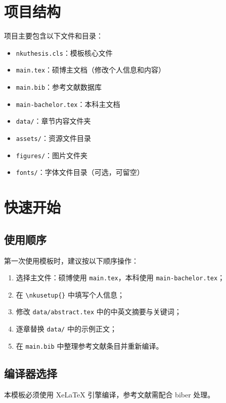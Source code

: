 \section{项目结构}

项目主要包含以下文件和目录：

\begin{itemize}
    \item \texttt{nkuthesis.cls}：模板核心文件
    \item \texttt{main.tex}：硕博主文档（修改个人信息和内容）
    \item \texttt{main.bib}：参考文献数据库
    \item \texttt{main-bachelor.tex}：本科主文档
    \item \texttt{data/}：章节内容文件夹
    \item \texttt{assets/}：资源文件目录
    \item \texttt{figures/}：图片文件夹
    \item \texttt{fonts/}：字体文件目录（可选，可留空）
\end{itemize}

\section{快速开始}

\subsection{使用顺序}

第一次使用模板时，建议按以下顺序操作：

\begin{enumerate}
    \item 选择主文件：硕博使用 \texttt{main.tex}，本科使用 \texttt{main-bachelor.tex}；
    \item 在 \texttt{\textbackslash nkusetup\{\}} 中填写个人信息；
    \item 修改 \texttt{data/abstract.tex} 中的中英文摘要与关键词；
    \item 逐章替换 \texttt{data/} 中的示例正文；
    \item 在 \texttt{main.bib} 中整理参考文献条目并重新编译。
\end{enumerate}

\subsection{编译器选择}

本模板必须使用 XeLaTeX 引擎编译，参考文献需配合 biber 处理。

